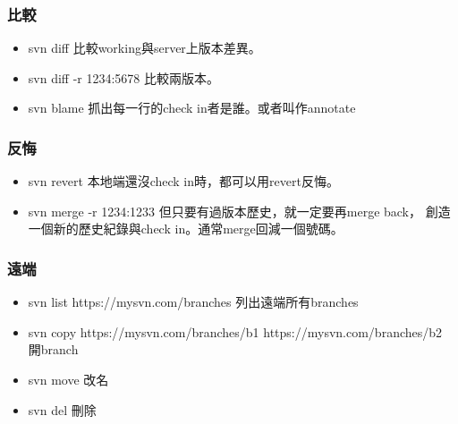   \subsubsection{比較}
  \begin{itemize}
    \item svn diff 比較working與server上版本差異。
    \item svn diff -r 1234:5678 比較兩版本。
    \item svn blame 抓出每一行的check in者是誰。或者叫作annotate
  \end{itemize}
  \subsubsection{反悔}
  \begin{itemize}
    \item svn revert 本地端還沒check in時，都可以用revert反悔。
    \item svn merge -r 1234:1233 但只要有過版本歷史，就一定要再merge back，
      創造一個新的歷史紀錄與check in。通常merge回減一個號碼。
  \end{itemize}
  \subsubsection{遠端}
  \begin{itemize}
    \item svn list https://mysvn.com/branches 列出遠端所有branches
    \item svn copy https://mysvn.com/branches/b1 https://mysvn.com/branches/b2
      開branch
    \item svn move 改名
    \item svn del 刪除
  \end{itemize}
